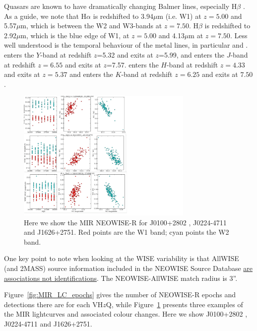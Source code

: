 \documentclass[usenatbib]{mnras}
\begin{document}
Quasars are known to have dramatically changing Balmer lines,
especially H$\beta$ \citep[e.g.,][]{LaMassa2015, Ruan2016, Runnoe2016,
Macleod2016, Gezari2017, Runco2016, YangQ2018, Assef2018, Stern2018,
Ross2018, MacLeod2019, Graham2019}. As a guide, we note that H$\alpha$
is redshifted to 3.94$\mu$m (i.e. W1) at $z=5.00$ and 5.57$\mu$m,
which is between the W2 and W3-bands at $z=7.50$.  H$\beta$ is
redshifted to 2.92$\mu$m, which is the blue edge of W1, at $z=5.00$
and 4.13$\mu$m at $z=7.50$. Less well understood is the temporal
behaviour of the metal lines, in particular \civ and \mgii.  \civ
enters the $Y$-band at redshift $z$=5.32 and exits at $z$=5.99, and
enters the $J$-band at redshift $z=6.55$ and exits at $z$=7.57. \mgii
enters the $H$-band at redshift $z=4.33$ and exits at $z=5.37$ and
enters the $K$-band at redshift $z=6.25$ and exits at $7.50$.


\begin{figure}
  \includegraphics[width=8.5cm]
  {../light_curves/MIR_LCs/three_MIR_LC_egs_20180827.pdf}
  \centering
  \caption[]
  {Here we show the MIR NEOWISE-R for J0100+2802 \citep{Wu2015}, J0224-4711 and  J1626+2751. 
    Red points are the W1 band; cyan points the W2 band.} 
  \label{fig:MIR_LC_3egs}
\end{figure}
One key point to note when looking at the WISE variability is 
that AllWISE (and 2MASS) source information included in the NEOWISE Source Database 
\href{http://wise2.ipac.caltech.edu/docs/release/neowise/expsup/sec2_1f.html}{are associations not identifications}. 
The NEOWISE-AllWISE match radius is 3''. 

Figure~\ref{fig:MIR_LC_epochs} gives the number of NEOWISE-R epochs
and detections there are for each VH$z$Q, while
Figure~\ref{fig:MIR_LC_3egs} presents three examples of the MIR
lightcurves and associated colour changes. Here we show J0100+2802
\citep{Wu2015}, J0224-4711 and J1626+2751.
\end{document}
